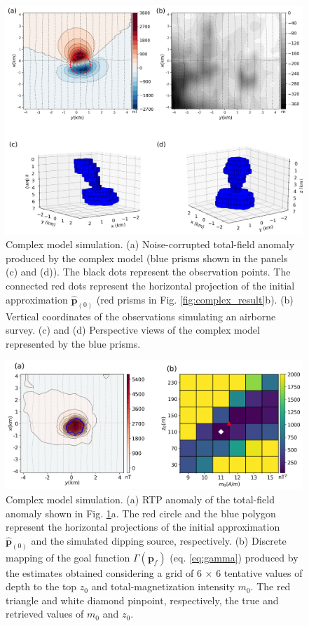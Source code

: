 \begin{figure}
    \centering
    \includegraphics[width=\linewidth]{figures/complex_model_data.png}
    \caption{Complex model simulation. (a) Noise-corrupted total-field anomaly produced by the complex model (blue prisms shown in the panels (c) and (d)). The black dots represent the observation points. The connected red dots represent the horizontal projection 
   	of the initial approximation $\hat{\mathbf{p}}_{(0)}$ 
   	(red prisms in Fig. \ref{fig:complex_result}b). (b) Vertical coordinates of the observations simulating an airborne survey. (c) and (d) Perspective views of the complex model represented by the blue prisms.
}
    \label{fig:complex_model}
\end{figure}

\begin{figure}
    \centering
    \includegraphics[width=\linewidth]{figures/complex_rtp.png}
    \caption{Complex model simulation. (a) RTP anomaly of the total-field anomaly shown in 
	Fig. \ref{fig:complex_model}a. 
	The red circle and the blue polygon represent the horizontal projections of the 	   initial approximation $\hat{\mathbf{p}}_{(0)}$ and  the simulated dipping source, respectively.
	(b) Discrete mapping of the goal function $\Gamma(\mathbf{p}_f)$ (eq. \ref{eq:gamma}) produced by the estimates   	       obtained considering a grid of 6 $\times$ 6 tentative values of 
	   depth to the top $z_0$ and total-magnetization intensity $m_0$. 
	   The red triangle  and white diamond pinpoint, respectively, the true and retrieved 	   
	   values of $m_0$  and $z_0$.     
}
    \label{fig:complex_rtp}
\end{figure}

